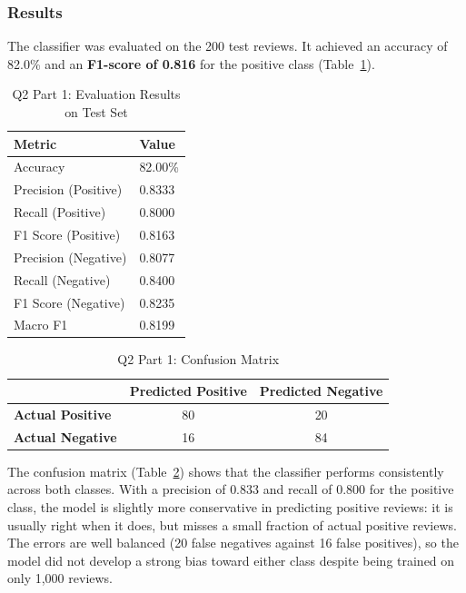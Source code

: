 \documentclass[sigconf]{acmart}
\begin{document}
\subsubsection{Results}
The classifier was evaluated on the 200 test reviews. It achieved an accuracy of 82.0\% and an \textbf{F1-score of 0.816} for the positive class (Table~\ref{tab:q2p1-metrics}).

\begin{table}[H]
\caption{Q2 Part 1: Evaluation Results on Test Set}
\label{tab:q2p1-metrics}
\begin{tabular}{@{}ll@{}}
\toprule
\textbf{Metric} & \textbf{Value} \\ \midrule
Accuracy & 82.00\% \\
Precision (Positive) & 0.8333 \\
Recall (Positive) & 0.8000 \\
F1 Score (Positive) & 0.8163 \\
Precision (Negative) & 0.8077 \\
Recall (Negative) & 0.8400 \\
F1 Score (Negative) & 0.8235 \\
Macro F1 & 0.8199 \\ \bottomrule
\end{tabular}
\end{table}

\begin{table}[H]
\caption{Q2 Part 1: Confusion Matrix}
\label{tab:q2p1-confusion}
\begin{tabular}{@{}lcc@{}}
\toprule
 & \textbf{Predicted Positive} & \textbf{Predicted Negative} \\ \midrule
\textbf{Actual Positive} & 80 & 20 \\
\textbf{Actual Negative} & 16 & 84 \\ \bottomrule
\end{tabular}
\end{table}

The confusion matrix (Table~\ref{tab:q2p1-confusion}) shows that the classifier performs consistently across both classes. With a precision of 0.833 and recall of 0.800 for the positive class, the model is slightly more conservative in predicting positive reviews: it is usually right when it does, but misses a small fraction of actual positive reviews. The errors are well balanced (20 false negatives against 16 false positives), so the model did not develop a strong bias toward either class despite being trained on only 1,000 reviews.
\end{document}
